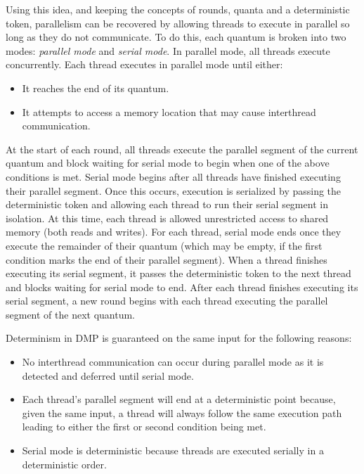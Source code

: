 Using this idea, and keeping the concepts of rounds, quanta and a
deterministic token, parallelism can be recovered by allowing threads
to execute in parallel so long as they do not communicate.  To do
this, each quantum is broken into two modes: \emph{parallel mode} and
\emph{serial mode}.  In parallel mode, all threads execute
concurrently.  Each thread executes in parallel mode until either:

\begin{itemize}
\item It reaches the end of its quantum.

\item It attempts to access a memory location that may cause
  interthread communication.
\end{itemize}

At the start of each round, all threads execute the parallel segment
of the current quantum and block waiting for serial mode to begin when
one of the above conditions is met.  Serial mode begins after all
threads have finished executing their parallel segment.  Once this
occurs, execution is serialized by passing the deterministic token and
allowing each thread to run their serial segment in isolation.  At
this time, each thread is allowed unrestricted access to shared memory
(both reads and writes).  For each thread, serial mode ends once they
execute the remainder of their quantum (which may be empty, if the
first condition marks the end of their parallel segment).  When a
thread finishes executing its serial segment, it passes the
deterministic token to the next thread and blocks waiting for serial
mode to end.  After each thread finishes executing its serial segment,
a new round begins with each thread executing the parallel segment of
the next quantum.

Determinism in DMP is guaranteed on the same input for the following
reasons:

\begin{itemize}
\item No interthread communication can occur during parallel mode as
  it is detected and deferred until serial mode.

\item Each thread's parallel segment will end at a deterministic point
  because, given the same input, a thread will always follow the same
  execution path leading to either the first or second condition being
  met.

\item Serial mode is deterministic because threads are executed
  serially in a deterministic order.
\end{itemize}

